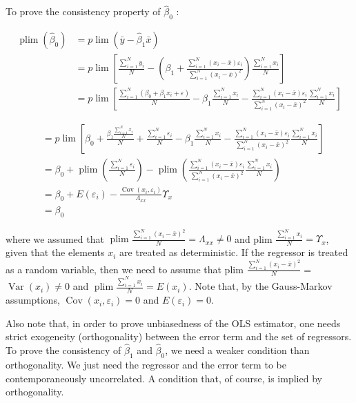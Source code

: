 To prove the consistency property of $\widehat{\beta}_{0}$ :

$$
\begin{aligned}
\operatorname{plim}\left(\widehat{\beta}_{0}\right) & =p \lim \left(\bar{y}-\widehat{\beta}_{1} \bar{x}\right) \\
& =p \lim \left[\frac{\sum_{i=1}^{N} y_{i}}{N}-\left(\beta_{1}+\frac{\sum_{i=1}^{N}\left(x_{i}-\bar{x}\right) \varepsilon_{i}}{\sum_{i=1}^{N}\left(x_{i}-\bar{x}\right)^{2}}\right) \frac{\sum_{i=1}^{N} x_{i}}{N}\right] \\
& =p \lim \left[\frac{\sum_{i=1}^{N}\left(\beta_{0}+\beta_{1} x_{i}+\varepsilon\right)}{N}-\beta_{1} \frac{\sum_{i=1}^{N} x_{i}}{N}-\frac{\sum_{i=1}^{N}\left(x_{i}-\bar{x}\right) \varepsilon_{i}}{\sum_{i=1}^{N}\left(x_{i}-\bar{x}\right)^{2}} \frac{\sum_{i=1}^{N} x_{i}}{N}\right]
\end{aligned}
$$

$$
\begin{aligned}
& =p \lim \left[\beta_{0}+\frac{\beta_{1} \frac{\sum_{i=1}^{N} x_{i}}{N}}{N}+\frac{\sum_{i=1}^{N} \varepsilon_{i}}{N}-\beta_{1} \frac{\sum_{i=1}^{N} x_{i}}{N}-\frac{\sum_{i=1}^{N}\left(x_{i}-\bar{x}\right) \varepsilon_{i}}{\sum_{i=1}^{N}\left(x_{i}-\bar{x}\right)^{2}} \frac{\sum_{i=1}^{N} x_{i}}{N}\right] \\
& =\beta_{0}+\operatorname{plim}\left(\frac{\sum_{i=1}^{N} \varepsilon_{i}}{N}\right)-\operatorname{plim}\left(\frac{\sum_{i=1}^{N}\left(x_{i}-\bar{x}\right) \varepsilon_{i}}{\sum_{i=1}^{N}\left(x_{i}-\bar{x}\right)^{2}} \frac{\sum_{i=1}^{N} x_{i}}{N}\right) \\
& =\beta_{0}+E\left(\varepsilon_{i}\right)-\frac{\operatorname{Cov}\left(x_{i}, \varepsilon_{i}\right)}{\Lambda_{x x}} \Upsilon_{x} \\
& =\beta_{0}
\end{aligned}
$$

where we assumed that $\operatorname{plim} \frac{\sum_{i=1}^{N}\left(x_{i}-\bar{x}\right)^{2}}{N}=\Lambda_{x x} \neq 0$ and plim $\frac{\sum_{i=1}^{N} x_{i}}{N}=\Upsilon_{x}$, given that the elements $x_{i}$ are treated as deterministic. If the regressor is treated as a random variable, then we need to assume that plim $\frac{\sum_{i=1}^{N}\left(x_{i}-\bar{x}\right)^{2}}{N}=$ $\operatorname{Var}\left(x_{i}\right) \neq 0$ and $\operatorname{plim} \frac{\sum_{i=1}^{N} x_{i}}{N}=E\left(x_{i}\right)$. Note that, by the Gauss-Markov assumptions, $\operatorname{Cov}\left(x_{i}, \varepsilon_{i}\right)=0$ and $E\left(\varepsilon_{i}\right)=0$.

Also note that, in order to prove unbiasedness of the OLS estimator, one needs strict exogeneity (orthogonality) between the error term and the set of regressors. To prove the consistency of $\widehat{\beta}_{1}$ and $\widehat{\beta}_{0}$, we need a weaker condition than orthogonality. We just need the regressor and the error term to be contemporaneously uncorrelated. A condition that, of course, is implied by orthogonality.